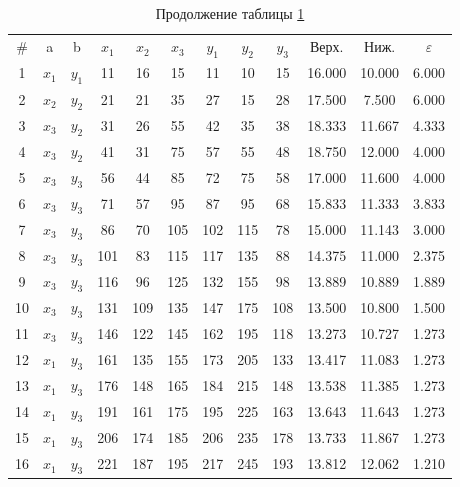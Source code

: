 \begin{longtable}[H]{c|c|c|c|c|c|c|c|c|c|c|c|}
    \caption{Результаты итерационного процесса с указанием стратегий
     и стоимостей игры}\label{tab:tab1}\\ \hline
    \endfirsthead
    \caption*{Продолжение таблицы \ref{tab:tab1}}\\ \hline
    \endhead
    \hline
    \endfoot
    \hline
    \endlastfoot
    \# & a & b & $x_1$ & $x_2$ & $x_3$ & $y_1$ & $y_2$ & $y_3$ & Верх. & Ниж. & $\varepsilon$ \\ \hline
    1 & $x_1$ & $y_1$ & 11 & 16 & 15 & 11 & 10 & 15 & 16.000 & 10.000 & 6.000 \\ \hline
    2 & $x_2$ & $y_2$ & 21 & 21 & 35 & 27 & 15 & 28 & 17.500 & 7.500 & 6.000 \\ \hline
    3 & $x_3$ & $y_2$ & 31 & 26 & 55 & 42 & 35 & 38 & 18.333 & 11.667 & 4.333 \\ \hline
    4 & $x_3$ & $y_2$ & 41 & 31 & 75 & 57 & 55 & 48 & 18.750 & 12.000 & 4.000 \\ \hline
    5 & $x_3$ & $y_3$ & 56 & 44 & 85 & 72 & 75 & 58 & 17.000 & 11.600 & 4.000 \\ \hline
    6 & $x_3$ & $y_3$ & 71 & 57 & 95 & 87 & 95 & 68 & 15.833 & 11.333 & 3.833 \\ \hline
    7 & $x_3$ & $y_3$ & 86 & 70 & 105 & 102 & 115 & 78 & 15.000 & 11.143 & 3.000 \\ \hline
    8 & $x_3$ & $y_3$ & 101 & 83 & 115 & 117 & 135 & 88 & 14.375 & 11.000 & 2.375 \\ \hline
    9 & $x_3$ & $y_3$ & 116 & 96 & 125 & 132 & 155 & 98 & 13.889 & 10.889 & 1.889 \\ \hline
    10 & $x_3$ & $y_3$ & 131 & 109 & 135 & 147 & 175 & 108 & 13.500 & 10.800 & 1.500 \\ \hline
    11 & $x_3$ & $y_3$ & 146 & 122 & 145 & 162 & 195 & 118 & 13.273 & 10.727 & 1.273 \\ \hline
    12 & $x_1$ & $y_3$ & 161 & 135 & 155 & 173 & 205 & 133 & 13.417 & 11.083 & 1.273 \\ \hline
    13 & $x_1$ & $y_3$ & 176 & 148 & 165 & 184 & 215 & 148 & 13.538 & 11.385 & 1.273 \\ \hline
    14 & $x_1$ & $y_3$ & 191 & 161 & 175 & 195 & 225 & 163 & 13.643 & 11.643 & 1.273 \\ \hline
    15 & $x_1$ & $y_3$ & 206 & 174 & 185 & 206 & 235 & 178 & 13.733 & 11.867 & 1.273 \\ \hline
    16 & $x_1$ & $y_3$ & 221 & 187 & 195 & 217 & 245 & 193 & 13.812 & 12.062 & 1.210 \\ \hline

\end{longtable}
